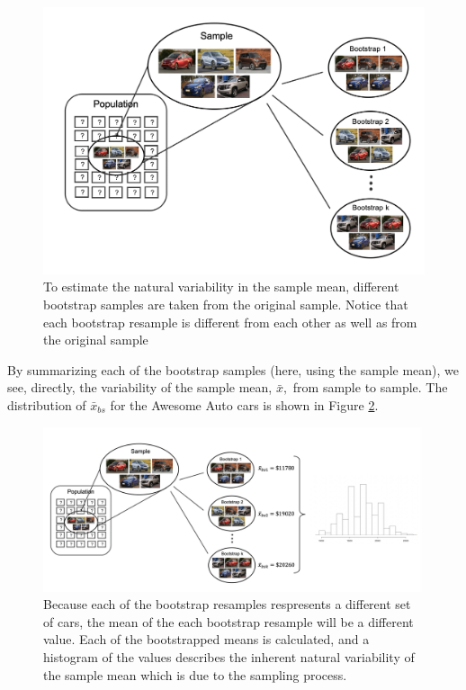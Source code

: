\documentclass[
  10pt,
  openany]{book}
\begin{document}
\begin{figure}[h]

{\centering \includegraphics[width=0.8\linewidth]{images/bootsamps1mean} 

}

\caption{To estimate the natural variability in the sample mean, different bootstrap samples are taken from the original sample.  Notice that each bootstrap resample is different from each other as well as from the original sample}\label{fig:bootsamps1mean}
\end{figure}

By summarizing each of the bootstrap samples (here, using the sample mean), we see, directly, the variability of the sample mean, \(\bar{x},\) from sample to sample.
The distribution of \(\bar{x}_{bs}\) for the Awesome Auto cars is shown in Figure \ref{fig:bootmeans1mean}.

\begin{figure}[h]

{\centering \includegraphics[width=1\linewidth]{images/bootmeans1mean} 

}

\caption{Because each of the bootstrap resamples respresents a different set of cars, the mean of the each bootstrap resample will be a different value.  Each of the bootstrapped means is calculated, and a histogram of the values describes the inherent natural variability of the sample mean which is due to the sampling process.}\label{fig:bootmeans1mean}
\end{figure}
\end{document}
